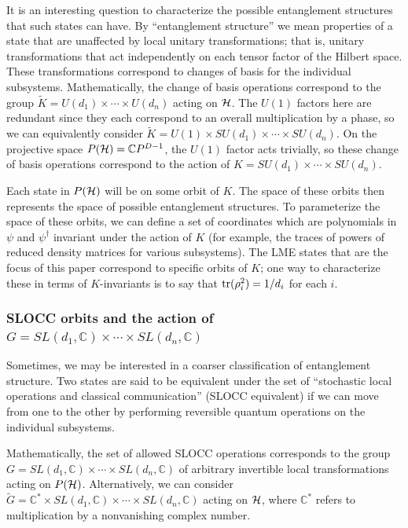 \documentclass[12pt]{article}
\theoremstyle{definition}
\newcommand{\tr}{{\rm tr}}
\begin{document}
It is an interesting question to characterize the possible entanglement structures that such states can have. By ``entanglement structure'' we mean properties of a state that are unaffected by local unitary transformations; that is, unitary transformations that act independently on each tensor factor of the Hilbert space. These transformations correspond to changes of basis for the individual subsystems. Mathematically, the change of basis operations correspond to the group  $\tilde{K} = U(d_1) \times \cdots \times U(d_n)$ acting on ${\cal H}$. The $U(1)$ factors here are redundant since they each correspond to an overall multiplication by a phase, so we can equivalently consider $\tilde{K} = U(1) \times SU(d_1) \times \cdots \times SU(d_n)$. On the projective space $P({\cal H}) = \mathbb{C} P^{D-1}$, the $U(1)$ factor acts trivially, so these change of basis operations correspond to the action of $K = SU(d_1) \times \cdots \times SU(d_n)$.

Each state in $P({\cal H})$ will be on some orbit of $K$. The space of these orbits then represents the space of possible entanglement structures. To parameterize the space of these orbits, we can define a set of coordinates which are polynomials in $\psi$ and $\psi^\dagger$ invariant under the action of $K$ (for example, the traces of powers of reduced density matrices for various subsystems). The LME states that are the focus of this paper correspond to specific orbits of $K$; one way to characterize these in terms of $K$-invariants is to say that $\tr(\rho_i^2) = 1/d_i$ for each $i$.

\subsubsection{SLOCC orbits and the action of $G = SL(d_1,\mathbb{C}) \times \cdots \times SL(d_n,\mathbb{C})$}

Sometimes, we may be interested in a coarser classification of entanglement structure. Two states are said to be equivalent under the set of ``stochastic local operations and classical communication'' (SLOCC equivalent) if we can move from one to the other by performing reversible quantum operations on the individual subsystems.

Mathematically, the set of allowed SLOCC operations corresponds to the group $G = SL(d_1, \mathbb{C}) \times \cdots \times SL(d_n, \mathbb{C})$ of arbitrary invertible local transformations acting on $P({\cal H})$. Alternatively, we can consider $\tilde{G} = \mathbb{C}^* \times SL(d_1, \mathbb{C}) \times \cdots \times SL(d_n, \mathbb{C})$ acting on ${\cal H}$, where $\mathbb{C}^*$ refers to multiplication by a nonvanishing complex number.
\end{document}
